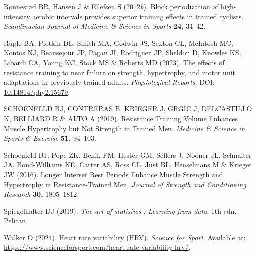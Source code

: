 \documentclass[
  letterpaper,
  DIV=11,
  numbers=noendperiod]{scrreprt}
\newlength{\cslhangindent}
\newenvironment{CSLReferences}[2] %
 {\begin{list}{}{%
  \setlength{\itemindent}{0pt}
  \setlength{\leftmargin}{0pt}
  \setlength{\parsep}{0pt}
  \ifodd #1
   \setlength{\leftmargin}{\cslhangindent}
   \setlength{\itemindent}{-1\cslhangindent}
  \fi
  \setlength{\itemsep}{#2\baselineskip}}}
 {\end{list}}
\begin{document}
\begin{CSLReferences}{1}{1}
Rønnestad BR, Hansen J \& Ellefsen S (2012\emph{b}).
\href{https://doi.org/10.1111/j.1600-0838.2012.01485.x}{Block
periodization of high{-}intensity aerobic intervals provides superior
training effects in trained cyclists}. \emph{Scandinavian Journal of
Medicine \& Science in Sports} \textbf{24,} 34--42.

Ruple BA, Plotkin DL, Smith MA, Godwin JS, Sexton CL, McIntosh MC,
Kontos NJ, Beausejour JP, Pagan JI, Rodriguez JP, Sheldon D, Knowles KS,
Libardi CA, Young KC, Stock MS \& Roberts MD (2023). The effects of
resistance training to near failure on strength, hypertrophy, and motor
unit adaptations in previously trained adults. \emph{Physiological
Reports}; DOI:
\href{https://doi.org/10.14814/phy2.15679}{10.14814/phy2.15679}.

SCHOENFELD BJ, CONTRERAS B, KRIEGER J, GRGIC J, DELCASTILLO K, BELLIARD
R \& ALTO A (2019).
\href{https://doi.org/10.1249/mss.0000000000001764}{Resistance Training
Volume Enhances Muscle Hypertrophy but Not Strength in Trained Men}.
\emph{Medicine \& Science in Sports \& Exercise} \textbf{51,} 94--103.

Schoenfeld BJ, Pope ZK, Benik FM, Hester GM, Sellers J, Nooner JL,
Schnaiter JA, Bond-Williams KE, Carter AS, Ross CL, Just BL, Henselmans
M \& Krieger JW (2016).
\href{https://doi.org/10.1519/jsc.0000000000001272}{Longer Interset Rest
Periods Enhance Muscle Strength and Hypertrophy in Resistance-Trained
Men}. \emph{Journal of Strength and Conditioning Research} \textbf{30,}
1805--1812.

Spiegelhalter DJ (2019). \emph{The art of statistics : Learning from
data}, 1th edn. Pelican.

Walker O (2024). Heart rate variability (HRV). \emph{Science for Sport}.
Available at:
\url{https://www.scienceforsport.com/heart-rate-variability-hrv/}.

\end{CSLReferences}
\end{document}
